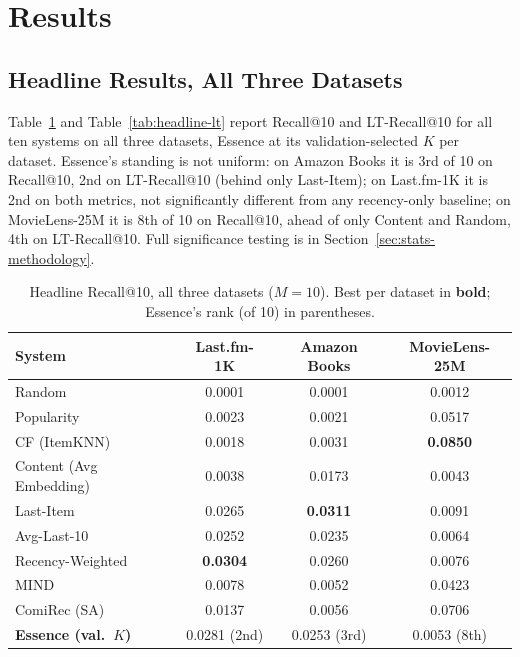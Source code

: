 \documentclass{article}
\begin{document}
\section{Results}
\label{sec:results}

\subsection{Headline Results, All Three Datasets}
\label{sec:headline}

Table~\ref{tab:headline-recall} and Table~\ref{tab:headline-lt} report Recall@10 and LT-Recall@10 for all ten systems on all three datasets, Essence at its validation-selected $K$ per dataset. Essence's standing is not uniform: on Amazon Books it is 3rd of 10 on Recall@10, 2nd on LT-Recall@10 (behind only Last-Item); on Last.fm-1K it is 2nd on both metrics, not significantly different from any recency-only baseline; on MovieLens-25M it is 8th of 10 on Recall@10, ahead of only Content and Random, 4th on LT-Recall@10. Full significance testing is in Section~\ref{sec:stats-methodology}.

\begin{table}[t]
\centering
\caption{Headline Recall@10, all three datasets ($M=10$). Best per dataset in \textbf{bold}; Essence's rank (of 10) in parentheses.}
\label{tab:headline-recall}
\small
\begin{tabular}{lccc}
\toprule
\textbf{System} & \textbf{Last.fm-1K} & \textbf{Amazon Books} & \textbf{MovieLens-25M} \\
\midrule
Random & 0.0001 & 0.0001 & 0.0012 \\
Popularity & 0.0023 & 0.0021 & 0.0517 \\
CF (ItemKNN) & 0.0018 & 0.0031 & \textbf{0.0850} \\
Content (Avg Embedding) & 0.0038 & 0.0173 & 0.0043 \\
Last-Item & 0.0265 & \textbf{0.0311} & 0.0091 \\
Avg-Last-10 & 0.0252 & 0.0235 & 0.0064 \\
Recency-Weighted & \textbf{0.0304} & 0.0260 & 0.0076 \\
MIND & 0.0078 & 0.0052 & 0.0423 \\
ComiRec (SA) & 0.0137 & 0.0056 & 0.0706 \\
\textbf{Essence (val.\ $K$)} & 0.0281 (2nd) & 0.0253 (3rd) & 0.0053 (8th) \\
\bottomrule
\end{tabular}
\end{table}
\end{document}
